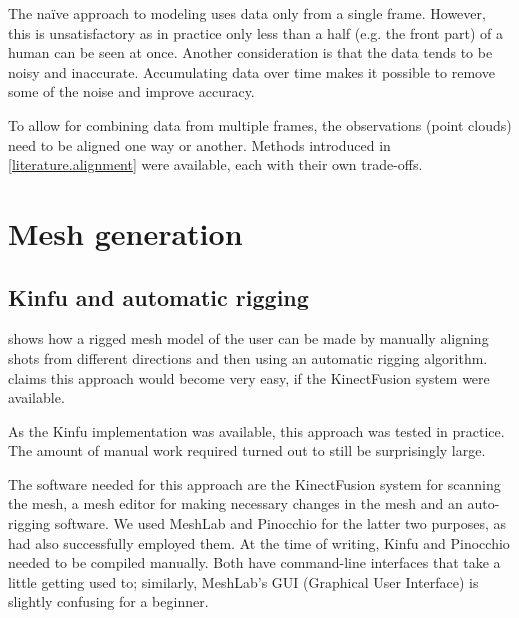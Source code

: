 The naïve approach to modeling uses data only from a single frame. However, this is unsatisfactory as in practice only less than a half (e.g. the front part) of a human can be seen at once. Another consideration is that the data tends to be noisy and inaccurate. Accumulating data over time makes it possible to remove some of the noise and improve accuracy.

To allow for combining data from multiple frames, the observations (point clouds) need to be aligned one way or another. Methods introduced in \autoref{literature.alignment} were available, each with their own trade-offs.


\section{Mesh generation}


\subsection{Kinfu and automatic rigging}

\begin{figure}
    \centering
    \label{fig:hannu-mesh}
\end{figure}

\citet{charpentier2011accurate} shows how a rigged mesh model of the user can be made by manually aligning shots from different directions and then using an automatic rigging algorithm. \citeauthor{charpentier2011accurate} claims this approach would become very easy, if the KinectFusion system were available.

As the Kinfu implementation was available, this approach was tested in practice. The amount of manual work required turned out to still be surprisingly large.

The software needed for this approach are the KinectFusion system for scanning the mesh, a mesh editor for making necessary changes in the mesh and an auto-rigging software. We used MeshLab and Pinocchio for the latter two purposes, as \citet{charpentier2011accurate} had also successfully employed them. At the time of writing, Kinfu and Pinocchio needed to be compiled manually. Both have command-line interfaces that take a little getting used to; similarly, MeshLab's GUI (Graphical User Interface) is slightly confusing for a beginner.

